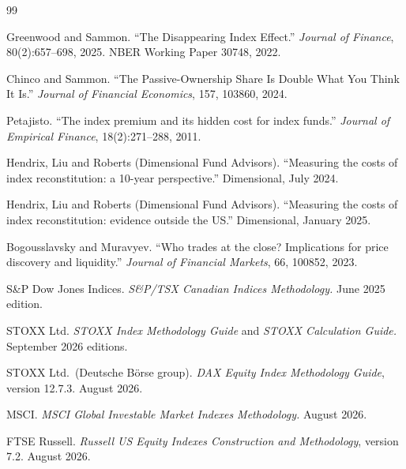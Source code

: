 \documentclass[10pt, a4paper, twocolumn]{article}
\begin{document}
\begin{thebibliography}{99}
\small

Greenwood and Sammon.
\newblock ``The Disappearing Index Effect.''
\newblock \textit{Journal of Finance}, 80(2):657--698, 2025. NBER Working Paper 30748, 2022.

Chinco and Sammon.
\newblock ``The Passive-Ownership Share Is Double What You Think It Is.''
\newblock \textit{Journal of Financial Economics}, 157, 103860, 2024.

Petajisto.
\newblock ``The index premium and its hidden cost for index funds.''
\newblock \textit{Journal of Empirical Finance}, 18(2):271--288, 2011.

Hendrix, Liu and Roberts (Dimensional Fund Advisors).
\newblock ``Measuring the costs of index reconstitution: a 10-year perspective.''
\newblock Dimensional, July 2024.

Hendrix, Liu and Roberts (Dimensional Fund Advisors).
\newblock ``Measuring the costs of index reconstitution: evidence outside the US.''
\newblock Dimensional, January 2025.

Bogousslavsky and Muravyev.
\newblock ``Who trades at the close? Implications for price discovery and liquidity.''
\newblock \textit{Journal of Financial Markets}, 66, 100852, 2023.

S\&P Dow Jones Indices.
\newblock \textit{S\&P/TSX Canadian Indices Methodology.} June 2025 edition.

STOXX Ltd.
\newblock \textit{STOXX Index Methodology Guide} and \textit{STOXX Calculation Guide.} September 2026 editions.

STOXX Ltd.\ (Deutsche B\"orse group).
\newblock \textit{DAX Equity Index Methodology Guide}, version 12.7.3. August 2026.

MSCI.
\newblock \textit{MSCI Global Investable Market Indexes Methodology.} August 2026.

FTSE Russell.
\newblock \textit{Russell US Equity Indexes Construction and Methodology}, version 7.2. August 2026.

\end{thebibliography}
\end{document}
